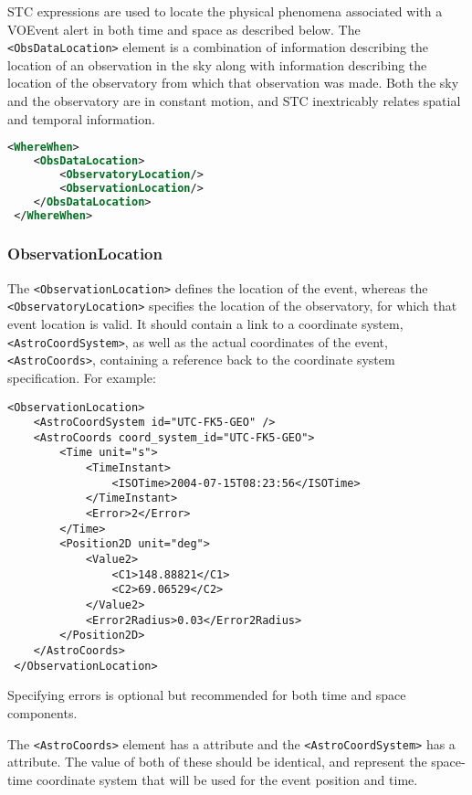 \documentclass[11pt,a4paper]{ivoa}
\begin{document}
STC expressions are used to locate the physical phenomena associated with a
VOEvent alert in both time and space as described below. The
\verb|<ObsDataLocation>| element is a combination of information describing the
location of an observation in the sky along with information describing the
location of the observatory from which that observation was made. Both the sky
and the observatory are in constant motion, and STC inextricably relates spatial
and temporal information.

\begin{lstlisting}[language=XML]
<WhereWhen>
    <ObsDataLocation>
        <ObservatoryLocation/>
        <ObservationLocation/>
    </ObsDataLocation>
 </WhereWhen>
\end{lstlisting}

\subsubsection{ObservationLocation}
\label{sec:3.4.1}

The \verb|<ObservationLocation>| defines the location of the event, whereas
the \verb|<ObservatoryLocation>| specifies the location of the observatory,
for which that event location is valid. It should contain a link to a
coordinate system, \verb|<AstroCoordSystem>|, as well as the actual coordinates
of the event, \verb|<AstroCoords>|, containing a reference back to the
coordinate system specification. For example:

\begin{lstlisting}
<ObservationLocation>
    <AstroCoordSystem id="UTC-FK5-GEO" />
    <AstroCoords coord_system_id="UTC-FK5-GEO">
        <Time unit="s">
            <TimeInstant>
                <ISOTime>2004-07-15T08:23:56</ISOTime>
            </TimeInstant>
            <Error>2</Error>
        </Time>
        <Position2D unit="deg">
            <Value2>
                <C1>148.88821</C1>
                <C2>69.06529</C2>
            </Value2>
            <Error2Radius>0.03</Error2Radius>
        </Position2D>
    </AstroCoords>
 </ObservationLocation>
\end{lstlisting}

Specifying errors is optional but recommended for both time and space
components.

The \verb|<AstroCoords>| element has a  attribute and the
\verb|<AstroCoordSystem>| has a  attribute. The value of both of these
should be identical, and represent the space-time coordinate system that will be
used for the event position and time.
\end{document}
